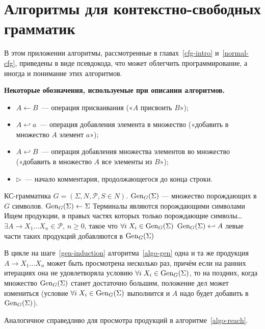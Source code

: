 
\renewcommand{\theAlgoEnv}{\Alph{chapter}.\arabic{AlgoEnv}}

\chapter{Алгоритмы для контекстно-свободных грамматик}

В этом приложении алгоритмы, рассмотренные в
главах~\ref{cfg-intro} и~\ref{normal-cfg}, приведены в виде
псевдокода, что может облегчить программирование, а иногда и
понимание этих алгоритмов.

\textbf{Некоторые обозначения, используемые при описании алгоритмов.}
\begin{itemize}
    \item
${A \gets B}$~— операция присваивания («$A$ присвоить $B$»);

    \item
$A \hookleftarrow a$~— операция добавления элемента в множество («добавить в
множество $A$ элемент $a$»);

    \item
$A \hookleftarrow B$~— операция добавления
множества элементов во множество («добавить в множество $A$ все элементы из
$B$»);

    \item
${\rhd}$~— начало комментария, продолжающегося до конца строки.
\end{itemize}

{\label{algo-gen}КС-грамматика $G=(\Sigma, N, \mathcal P, S \in N)$.}
{$\operatorname{Gen}_G(\Sigma)$  — множество порождающих в $G$ символов.}
{%
\li $\operatorname{Gen}_G(\Sigma) \gets \Sigma$ \Comment Терминалы являются порождающими
символами
\zi\Comment Ищем продукции, в правых частях которых только порождающие символы\ldots
\li \While $\exists A \to X_1 \ldots X_n \in \mathcal P$, $n \geqslant 0$,
такое что $\forall i \; X_i \in \operatorname{Gen}_G(\Sigma)$  \label{gen-induction}
\zi     \Do
        $\operatorname{Gen}_G(\Sigma) \hookleftarrow A$ \Comment левые части таких
        продукций добавляются в $\operatorname{Gen}_G(\Sigma)$
        \End
}

\begin{myremark}
В цикле на шаге~\ref{gen-induction} алгоритма~\ref{algo-gen}
одна и та же продукция $A \to X_1 \ldots X_n$
может быть просмотрена несколько раз, причём если на ранних итерациях она не
удовлетворяла условию $\forall i \; X_i \in \operatorname{Gen}_G(\Sigma)$, то на поздних,
когда множество $\operatorname{Gen}_G(\Sigma)$ станет достаточно большим, положение дел может
измениться (условие $\forall i \; X_i \in \operatorname{Gen}_G(\Sigma)$ выполнится и $A$ надо
будет добавить в $\operatorname{Gen}_G(\Sigma)$).

Аналогичное справедливо для просмотра продукций в алгоритме~\ref{algo-reach}.
\end{myremark}

